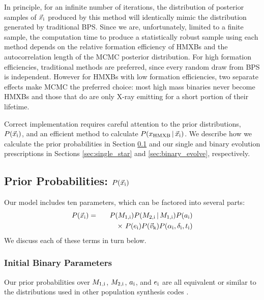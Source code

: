 \documentclass[usenatbib]{mnras}
\newcommand{\given}{\,|\,}
\begin{document}
In principle, for an infinite number of iterations, the distribution of posterior samples of $\vec{x}_{\rm i}$ produced by this method will identically mimic the distribution generated by traditional BPS. Since we are, unfortunately, limited to a finite sample, the computation time to produce a statistically robust sample using each method depends on the relative formation efficiency of HMXBs and the autocorrelation length of the MCMC posterior distribution. For high formation efficiencies, traditional methods are preferred, since every random draw from BPS is independent. However for HMXBs with low formation efficiencies, two separate effects make MCMC the preferred choice: most high mass binaries never become HMXBs and those that do are only X-ray emitting for a short portion of their lifetime.


Correct implementation requires careful attention to the prior distributions, $P(\vec{x}_{\rm i})$, and an efficient method to calculate $P(x_{\rm HMXB} \given \vec{x}_{\rm i})$. We describe how we calculate the prior probabilities in Section \ref{sec:priors} and our single and binary evolution prescriptions in Sections \ref{sec:single_star} and \ref{sec:binary_evolve}, respectively.




\subsection{Prior Probabilities: $P(\vec{x}_{\rm i})$} \label{sec:priors}

Our model includes ten parameters, which can be factored into several parts:
\begin{eqnarray}
P(\vec{x}_{\rm i}) &=& P(M_{\rm 1,i}) P(M_{\rm 2,i}\given M_{\rm 1,i}) P(a_{\rm i}) \nonumber \\
 & & \qquad  \times\ P(e_{\rm i}) P(\vec{v}_{\rm k}) P(\alpha_{\rm i}, \delta_{\rm i}, t_{\rm i})
\end{eqnarray}
We discuss each of these terms in turn below.

\subsubsection{Initial Binary Parameters}

Our prior probabilities over $M_{\rm 1,i}$, $M_{\rm 2,i}$, $a_{\rm i}$, and $e_{\rm i}$ are all equivalent or similar to the distributions used in other population synthesis codes \citep[e.g.,][]{belczynski08}.
\end{document}
